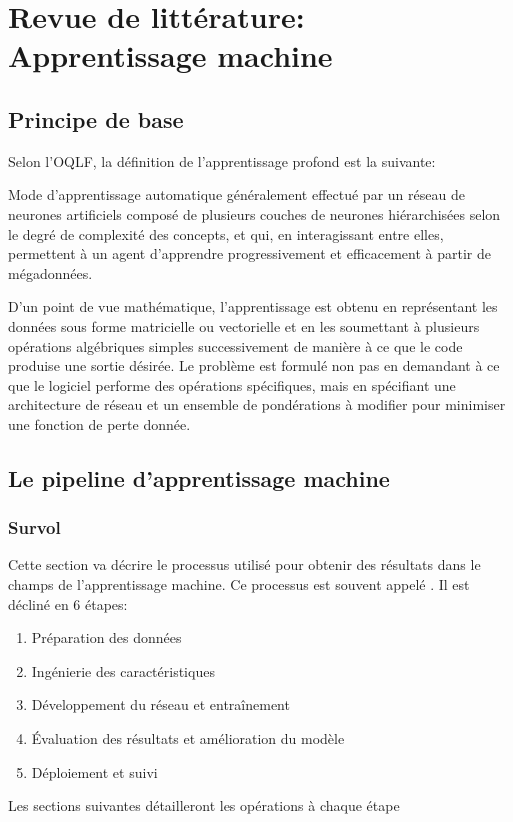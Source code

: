 \section{Revue de littérature: Apprentissage machine}
  \subsection{Principe de base}
    Selon l'\ac{OQLF}\parencite{oqlf_apprentissage_2024}, la définition de l'apprentissage profond est la suivante:
    \begin{definition}
    Mode d'apprentissage automatique généralement effectué par un réseau de neurones artificiels composé de plusieurs couches de neurones hiérarchisées selon le degré de complexité des concepts, et qui, en interagissant entre elles, permettent à un agent d'apprendre progressivement et efficacement à partir de mégadonnées.
    \end{definition}
    D'un point de vue mathématique, l'apprentissage est obtenu en représentant les données sous forme matricielle ou vectorielle et en les soumettant à plusieurs opérations algébriques simples successivement de manière à ce que le code produise une sortie désirée. Le problème est formulé non pas en demandant à ce que le logiciel performe des opérations spécifiques, mais en spécifiant une architecture de réseau et un ensemble de pondérations à modifier pour minimiser une fonction de perte donnée.
  \subsection{Le pipeline d'apprentissage machine}
  \subsubsection{Survol}
      Cette section va décrire le processus utilisé pour obtenir des résultats dans le champs de l'apprentissage machine. Ce processus est souvent appelé  \fg{}. Il est décliné en 6 étapes:
        \begin{enumerate}
          \item Préparation des données
          \item Ingénierie des caractéristiques
          \item Développement du réseau et entraînement
          \item Évaluation des résultats et amélioration du modèle
          \item Déploiement et suivi
        \end{enumerate}
      Les sections suivantes détailleront les opérations à chaque étape

